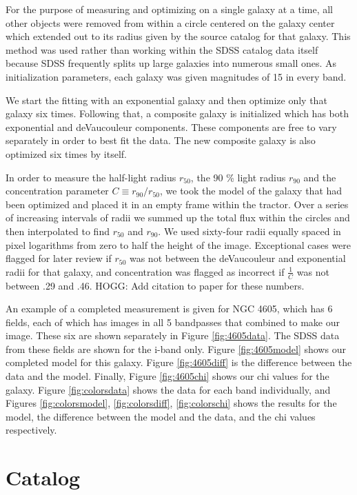 \documentclass[12pt,preprint,pdftex]{aastex}
\newcommand{\rfifty}{r_{50}}
\newcommand{\rninety}{r_{90}}
\newcommand{\conc}{C}
\begin{document}
For the purpose of measuring and optimizing on a single galaxy at a
time, all other objects were removed from within a circle centered on
the galaxy center which extended out to its radius given by the source
catalog for that galaxy. This method was used rather than working within the
SDSS catalog data itself because SDSS frequently splits up large galaxies into
numerous small ones. As initialization parameters, each galaxy was
given magnitudes of 15 in every band.

We start the fitting with an exponential galaxy and then optimize only
that galaxy six times. Following that, a composite galaxy is
initialized which has both exponential and deVaucouleur
components. These components are free to vary separately in order to
best fit the data. The new composite galaxy is also optimized six
times by itself.

In order to measure the half-light radius $\rfifty$, the 90 \% light
radius $\rninety$ and the concentration parameter $\conc\equiv
\rninety/\rfifty$, we took the model of the galaxy that had been
optimized and placed it in an empty frame within the tractor.
Over a series of increasing intervals of radii we summed up the total
flux within the circles and then interpolated to find $\rfifty$ and $\rninety$.
 We used sixty-four radii equally spaced in pixel logarithms from zero
 to half the height of the image. Exceptional cases were flagged for later
 review if $\rfifty$ was not between the deVaucouleur and exponential radii
 for that galaxy, and concentration was flagged as incorrect if $\frac{1}{\conc}$
 was not between .29 and .46. HOGG: Add citation to paper for these numbers.

An example of a completed measurement is given for NGC 4605, which has 6
fields, each of which has images in all 5 bandpasses that combined to make our image. These six are shown separately in Figure \ref{fig:4605data}. The SDSS data from these fields are shown
for the i-band only. Figure \ref{fig:4605model} shows our completed model for
this galaxy. Figure \ref{fig:4605diff} is the difference between the data
and the model. Finally, Figure \ref{fig:4605chi} shows our chi values for the
galaxy. Figure \ref{fig:colorsdata} shows the data for each
band individually, and Figures \ref{fig:colorsmodel}, \ref{fig:colorsdiff},
\ref{fig:colorschi} shows the results for the model, the difference
between the model and the data, and the chi values respectively.

\section{Catalog}
\end{document}
